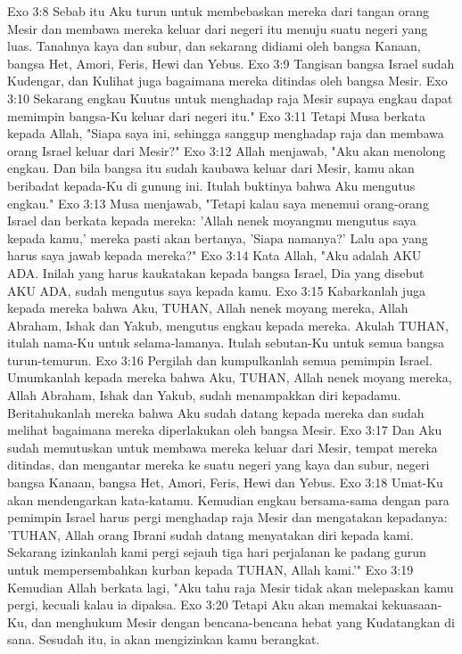 Exo 3:8  Sebab itu Aku turun untuk membebaskan mereka dari tangan orang Mesir dan membawa mereka keluar dari negeri itu menuju suatu negeri yang luas. Tanahnya kaya dan subur, dan sekarang didiami oleh bangsa Kanaan, bangsa Het, Amori, Feris, Hewi dan Yebus.
Exo 3:9  Tangisan bangsa Israel sudah Kudengar, dan Kulihat juga bagaimana mereka ditindas oleh bangsa Mesir.
Exo 3:10  Sekarang engkau Kuutus untuk menghadap raja Mesir supaya engkau dapat memimpin bangsa-Ku keluar dari negeri itu."
Exo 3:11  Tetapi Musa berkata kepada Allah, "Siapa saya ini, sehingga sanggup menghadap raja dan membawa orang Israel keluar dari Mesir?"
Exo 3:12  Allah menjawab, "Aku akan menolong engkau. Dan bila bangsa itu sudah kaubawa keluar dari Mesir, kamu akan beribadat kepada-Ku di gunung ini. Itulah buktinya bahwa Aku mengutus engkau."
Exo 3:13  Musa menjawab, "Tetapi kalau saya menemui orang-orang Israel dan berkata kepada mereka: 'Allah nenek moyangmu mengutus saya kepada kamu,' mereka pasti akan bertanya, 'Siapa namanya?' Lalu apa yang harus saya jawab kepada mereka?"
Exo 3:14  Kata Allah, "Aku adalah AKU ADA. Inilah yang harus kaukatakan kepada bangsa Israel, Dia yang disebut AKU ADA, sudah mengutus saya kepada kamu.
Exo 3:15  Kabarkanlah juga kepada mereka bahwa Aku, TUHAN, Allah nenek moyang mereka, Allah Abraham, Ishak dan Yakub, mengutus engkau kepada mereka. Akulah TUHAN, itulah nama-Ku untuk selama-lamanya. Itulah sebutan-Ku untuk semua bangsa turun-temurun.
Exo 3:16  Pergilah dan kumpulkanlah semua pemimpin Israel. Umumkanlah kepada mereka bahwa Aku, TUHAN, Allah nenek moyang mereka, Allah Abraham, Ishak dan Yakub, sudah menampakkan diri kepadamu. Beritahukanlah mereka bahwa Aku sudah datang kepada mereka dan sudah melihat bagaimana mereka diperlakukan oleh bangsa Mesir.
Exo 3:17  Dan Aku sudah memutuskan untuk membawa mereka keluar dari Mesir, tempat mereka ditindas, dan mengantar mereka ke suatu negeri yang kaya dan subur, negeri bangsa Kanaan, bangsa Het, Amori, Feris, Hewi dan Yebus.
Exo 3:18  Umat-Ku akan mendengarkan kata-katamu. Kemudian engkau bersama-sama dengan para pemimpin Israel harus pergi menghadap raja Mesir dan mengatakan kepadanya: 'TUHAN, Allah orang Ibrani sudah datang menyatakan diri kepada kami. Sekarang izinkanlah kami pergi sejauh tiga hari perjalanan ke padang gurun untuk mempersembahkan kurban kepada TUHAN, Allah kami.'"
Exo 3:19  Kemudian Allah berkata lagi, "Aku tahu raja Mesir tidak akan melepaskan kamu pergi, kecuali kalau ia dipaksa.
Exo 3:20  Tetapi Aku akan memakai kekuasaan-Ku, dan menghukum Mesir dengan bencana-bencana hebat yang Kudatangkan di sana. Sesudah itu, ia akan mengizinkan kamu berangkat.
